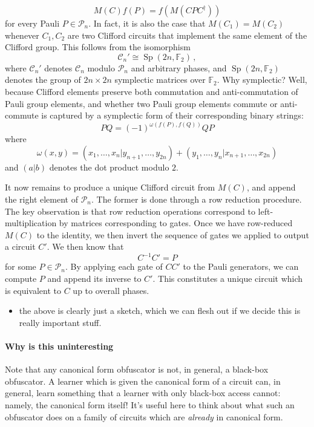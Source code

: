\documentclass[11pt]{article}
\numberwithin{equation}{section}
\newcommand{\opn}{\operatorname}
\newcommand{\F}{\mathbb{F}}
\begin{document}
{$$
M(C) f(P) = f( M (CPC^\dagger))
$$
for every Pauli $P \in \mathcal P_n$. In fact, it is also the case that $M(C_1) = M(C_2)$ whenever $C_1, C_2$ are two Clifford circuits that implement the same element of the Clifford group. This follows from the isomorphism
$$
\mathcal C_n' \cong \opn{Sp}(2n, \F_2)\,,
$$
where $\mathcal C_n'$ denotes $\mathcal C_n$ modulo $\mathcal P_n$ and arbitrary phases, and $\opn{Sp}(2n, \F_2)$ denotes the group of $2n \times 2n$ symplectic matrices over $\F_2$. Why symplectic? Well, because Clifford elements preserve both commutation and anti-commutation of Pauli group elements, and whether two Pauli group elements commute or anti-commute is captured by a symplectic form of their corresponding binary strings:
$$
PQ = (-1)^{\omega(f(P), f(Q))}QP
$$
where
$$
\omega(x, y) = (x_1, \dots, x_n | y_{n+1}, \dots, y_{2n}) + (y_1, \dots, y_n |  x_{n+1}, \dots, x_{2n})
$$
and $(a | b)$ denotes the dot product modulo $2$.

It now remains to produce a unique Clifford circuit from $M(C)$, and append the right element of $\mathcal P_n.$ The former is done through a row reduction procedure. The key observation is that row reduction operations correspond to left-multiplication by matrices corresponding to gates. Once we have row-reduced $M(C)$ to the identity, we then invert the sequence of gates we applied to output a circuit $C'$. We then know that
$$
C^{-1} C' = P
$$
for some $P \in \mathcal P_n$. By applying each gate of $CC'$ to the Pauli generators, we can compute $P$ and append its inverse to $C'$. This constitutes a unique circuit which is equivalent to $C$ up to overall phases.

\begin{itemize}
\item the above is clearly just a sketch, which we can flesh out if we decide this is really important stuff.
\end{itemize}

\paragraph{Why is this uninteresting}

Note that any canonical form obfuscator is not, in general, a black-box obfuscator. A learner which is given the canonical form of a circuit can, in general, learn something that a learner with only black-box access cannot: namely, the canonical form itself! It's useful here to think about what such an obfuscator does on a family of circuits which are \emph{already} in canonical form.

}
\end{document}

